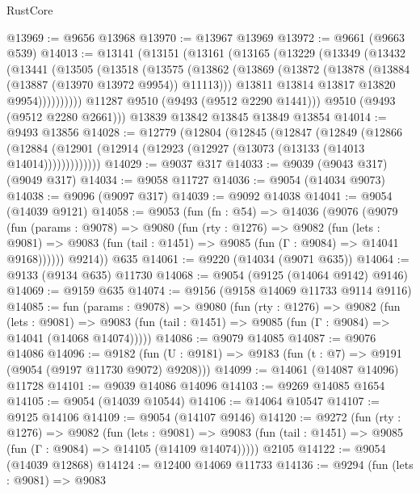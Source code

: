 \begin{lexlean}{RustCore}
\begin{coremodule}
@13969 := @9656 @13968
@13970 := @13967 @13969
@13972 := @9661 (@9663 @539)
@14013 := @13141
    (@13151
      (@13161
        (@13165
          (@13229
            (@13349
              (@13432
                (@13441
                  (@13505
                    (@13518
                      (@13575
                        (@13862
                          (@13869
                            (@13872 (@13878 (@13884 (@13887 (@13970 @13972 @9954)) @11113)))
                            @13811
                            @13814
                            @13817
                            @13820
                            @9954))))))))))
        @11287
        @9510
        (@9493 (@9512 @2290 @1441)))
      @9510
      (@9493 (@9512 @2280 @2661)))
    @13839
    @13842
    @13845
    @13849
    @13854
@14014 := @9493 @13856
@14028 := @12779
    (@12804
      (@12845
        (@12847
          (@12849
            (@12866
              (@12884 (@12901 (@12914 (@12923 (@12927 (@13073 (@13133 (@14013 @14014)))))))))))))
@14029 := @9037 @317
@14033 := @9039 (@9043 @317) (@9049 @317)
@14034 := @9058 @11727
@14036 := @9054 (@14034 @9073)
@14038 := @9096 (@9097 @317)
@14039 := @9092 @14038
@14041 := @9054 (@14039 @9121)
@14058 := @9053
    (fun (fn : @54) =>
    @14036
      (@9076
        (@9079
          (fun (params : @9078) =>
          @9080
            (fun (rty : @1276) =>
            @9082
              (fun (lets : @9081) =>
              @9083 (fun (tail : @1451) => @9085 (fun (Γ : @9084) => @14041 @9168))))))
        @9214))
    @635
@14061 := @9220 (@14034 (@9071 @635))
@14064 := @9133 (@9134 @635) @11730
@14068 := @9054 (@9125 (@14064 @9142) @9146)
@14069 := @9159 @635
@14074 := @9156 (@9158 @14069 @11733 @9114 @9116)
@14085 := fun (params : @9078) =>
  @9080
    (fun (rty : @1276) =>
    @9082
      (fun (lets : @9081) =>
      @9083 (fun (tail : @1451) => @9085 (fun (Γ : @9084) => @14041 (@14068 @14074)))))
@14086 := @9079 @14085
@14087 := @9076 @14086
@14096 := @9182
    (fun (U : @9181) => @9183 (fun (t : @7) => @9191 (@9054 (@9197 @11730 @9072) @9208)))
@14099 := @14061 (@14087 @14096) @11728
@14101 := @9039 @14086 @14096
@14103 := @9269 @14085 @1654
@14105 := @9054 (@14039 @10544)
@14106 := @14064 @10547
@14107 := @9125 @14106
@14109 := @9054 (@14107 @9146)
@14120 := @9272
    (fun (rty : @1276) =>
    @9082
      (fun (lets : @9081) =>
      @9083 (fun (tail : @1451) => @9085 (fun (Γ : @9084) => @14105 (@14109 @14074)))))
    @2105
@14122 := @9054 (@14039 @12868)
@14124 := @12400 @14069 @11733
@14136 := @9294
    (fun (lets : @9081) =>
    @9083

\end{coremodule}
\end{lexlean}
